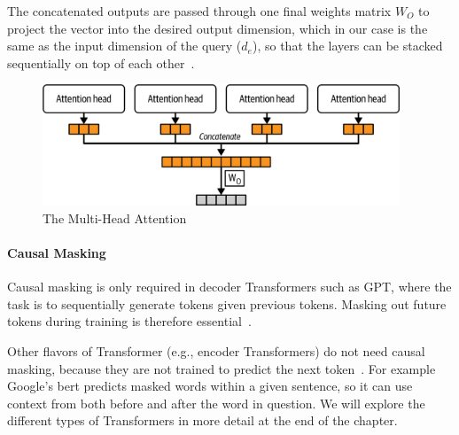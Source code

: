 The concatenated outputs are passed through one final weights matrix \(W_O\) to project the vector into the desired output dimension, which in our case is the same as the input dimension of the query (\( d_e \)), so that the layers can be stacked sequentially on top of each other~.

\begin{figure}
	\begin{center}
		\includegraphics[width=0.95\textwidth]{figures/multi_head}
	\end{center}
	\caption{The Multi-Head Attention}\label{fig:multi_head}
\end{figure}

\paragraph{Causal Masking}

Causal masking is only required in decoder Transformers such as GPT, where the task is to sequentially generate tokens given previous tokens.
Masking out future tokens during training is therefore essential~.

Other flavors of Transformer (e.g., encoder Transformers) do not need causal masking, because they are not trained to predict the next token~\cite{vaswani2017attention}.
For example Google’s \gls{bert} predicts masked words within a given sentence, so it can use context from both before and after the word in question.
We will explore the different types of Transformers in more detail at the end of the chapter.

